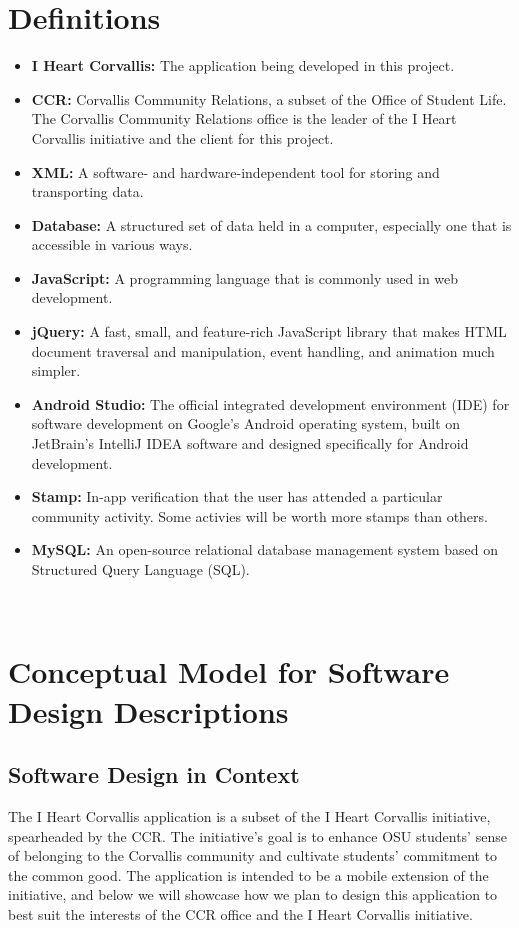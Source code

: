\documentclass[draftclsnofoot, onecolumn, 10pt, compsoc]{IEEEtran}
\begin{document}
	\section{Definitions}
		\begin{itemize}
			\item \textbf{I Heart Corvallis:} The application being developed in this project.
			\item \textbf{CCR:} Corvallis Community Relations, a subset of the Office of Student Life. The Corvallis Community Relations office is the leader of the I Heart Corvallis initiative and the client for this project.
			\item \textbf{XML:} A software- and hardware-independent tool for storing and transporting data.
			\item \textbf{Database:} A structured set of data held in a computer, especially one that is accessible in various ways.
			\item \textbf{JavaScript:} A programming language that is commonly used in web development.
			\item \textbf{jQuery:} A fast, small, and feature-rich JavaScript library that makes HTML document traversal and manipulation, event handling, and animation much simpler.
			\item \textbf{Android Studio:} The official integrated development environment (IDE) for software development on Google's Android operating system, built on JetBrain's IntelliJ IDEA software and designed specifically for Android development.
			\item \textbf{Stamp:} In-app verification that the user has attended a particular community activity. Some activies will be worth more stamps than others.
			\item \textbf{MySQL:} An open-source relational database management system based on Structured Query Language (SQL).
		\end{itemize}
			~\cite{jQuery}

	\section{Conceptual Model for Software Design Descriptions}
		\subsection{Software Design in Context}
			The I Heart Corvallis application is a subset of the I Heart Corvallis initiative, spearheaded by the CCR. The initiative's goal is to enhance OSU students' sense of belonging to the Corvallis community and cultivate students' commitment to the common good. The application is intended to be a mobile extension of the initiative, and below we will showcase how we plan to design this application to best suit the interests of the CCR office and the I Heart Corvallis initiative.
\end{document}
